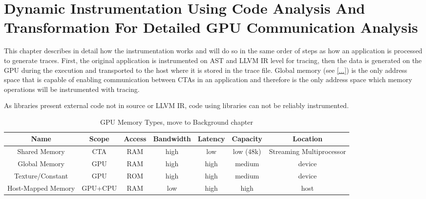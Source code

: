 \chapter{Dynamic Instrumentation Using Code Analysis And Transformation For Detailed GPU Communication Analysis}
This chapter describes in detail how the instrumentation works and will do so in the same order of steps as how an application is processed to generate traces.
First, the original application is instrumented on AST and LLVM IR level for tracing, then the data is generated on the GPU during the execution and transported to the host where it is stored in the trace file.
Global memory (see \ref{...}) is the only address space that is capable of enabling communication between
CTAs in an application and therefore is the only address space which memory operations will be instrumented
with tracing.

As libraries present external code not in source or LLVM IR, code using libraries can not be reliably instrumented.
%
%
%

\begin{table}
\begin{tabular}{|c|c|c|c|c|c|c|}
	\hline 
	Name & Scope & Access & Bandwidth & Latency & Capacity & Location \\ 
	\hline 
	Shared Memory & CTA & RAM & high & low & low (48k) & Streaming Multiprocessor \\ 
	\hline 
	Global Memory & GPU & RAM & high & high & medium & device \\ 
	\hline 
	Texture/Constant & GPU & ROM & high & high & medium & device \\ 
	\hline 
	Host-Mapped Memory & GPU+CPU & RAM & low & high & high & host \\ 
	\hline 
\end{tabular} 
\caption{GPU Memory Types, move to Background chapter}
\label{GPUMemTable}
\end{table}



%


